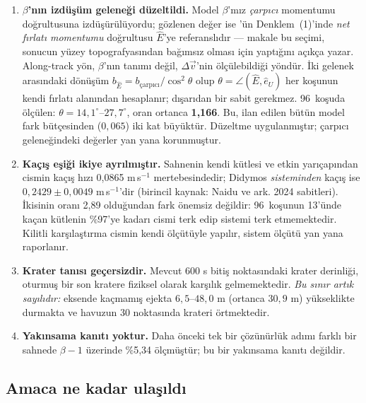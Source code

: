 \documentclass[12pt,a4paper]{article}
\newcommand{\havuzBiten}{96}
\begin{document}
\begin{enumerate}[leftmargin=9mm,itemsep=2pt,topsep=3pt]
\item \textbf{$\beta$'nın izdüşüm geleneği düzeltildi.} Model
      $\beta$'mız \emph{çarpıcı} momentumu doğrultusuna izdüşürülüyordu;
      gözlenen değer ise \citet{cheng2023}'ün Denklem~(1)'inde
      \emph{net fırlatı momentumu} doğrultusu $\hat{E}$'ye referanslıdır
      --- makale bu seçimi, sonucun yüzey topografyasından bağımsız
      olması için yaptığını açıkça yazar. Along-track yön, $\beta$'nın
      tanımı değil, $\Delta\vec{v}$'nin ölçülebildiği yöndür. İki
      gelenek arasındaki dönüşüm
      $b_{\hat{E}} = b_{\text{çarpıcı}}/\cos^{2}\theta$ olup
      $\theta=\angle(\hat{E},\hat{e}_U)$ her koşunun kendi fırlatı
      alanından hesaplanır; dışarıdan bir sabit gerekmez. \havuzBiten\ koşuda
      ölçülen: $\theta = 14{,}1^{\circ}$--$27{,}7^{\circ}$, oran
      ortanca \textbf{1,166}. Bu, ilan edilen bütün model fark
      bütçesinden ($0{,}065$) iki kat büyüktür. Düzeltme uygulanmıştır;
      çarpıcı geleneğindeki değerler yan yana korunmuştur.

\item \textbf{Kaçış eşiği ikiye ayrılmıştır.} Sahnenin kendi kütlesi ve
      etkin yarıçapından cismin kaçış hızı 0,0865 m\,s$^{-1}$
      mertebesindedir; Didymos \emph{sisteminden} kaçış ise
      $0{,}2429\pm0{,}0049$ m\,s$^{-1}$'dir (birincil kaynak: Naidu ve
      ark. 2024 sabitleri). İkisinin oranı 2,89 olduğundan fark
      önemsiz değildir: \havuzBiten\ koşunun 13'ünde kaçan kütlenin \%97'ye kadarı
      cismi terk edip sistemi terk etmemektedir. Kilitli karşılaştırma
      cismin kendi ölçütüyle yapılır, sistem ölçütü yan yana
      raporlanır.

\item \textbf{Krater tanısı geçersizdir.} Mevcut 600 s bitiş
      noktasındaki krater derinliği, oturmuş bir son kratere fiziksel
      olarak karşılık gelmemektedir. \emph{Bu sınır artık sayılıdır:}
      eksende kaçmamış ejekta $6{,}5$--$48{,}0$ m (ortanca
      $30{,}9$ m) yükseklikte durmakta ve havuzun 30 noktasında
      krateri örtmektedir.

\item \textbf{Yakınsama kanıtı yoktur.} Daha önceki tek bir çözünürlük
      adımı farklı bir sahnede $\beta-1$ üzerinde \%5,34 ölçmüştür; bu
      bir yakınsama kanıtı değildir.
\end{enumerate}

\subsection{Amaca ne kadar ulaşıldı}
\end{document}
